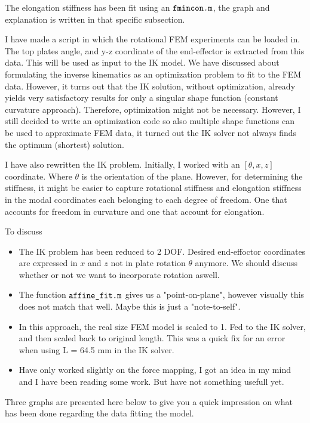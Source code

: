 The elongation stiffness has been fit using an $\verb+fmincon.m+$, the graph and explanation is written in that specific subsection.

I have made a script in which the rotational FEM experiments can be loaded in. The top plates angle, and y-z coordinate of the end-effector is extracted from this data. This will be used as input to the IK model. We have discussed about formulating the inverse kinematics as an optimization problem to fit to the FEM data. However, it turns out that the IK solution, without optimization, already yields very satisfactory results for only a singular shape function (constant curvature approach). Therefore, optimization might not be necessary. However, I still decided to write an optimization code so also multiple shape functions can be used to approximate FEM data, it turned out the IK solver not always finds the optimum (shortest) solution. 

I have also rewritten the IK problem. Initially, I worked with an $[\theta,x,z]$ coordinate. Where $\theta$ is the orientation of the plane. However, for determining the stiffness, it might be easier to capture rotational stiffness and elongation stiffness in the modal coordinates each belonging to each degree of freedom. One that accounts for freedom in curvature and one that account for elongation.

To discuss

\begin{itemize}
       \item The IK problem has been reduced to 2 DOF. Desired end-effoctor coordinates are expressed in $x$ and $z$ not in plate rotation $\theta$ anymore. We should discuss whether or not we want to incorporate rotation aswell.
    \item The function $\verb+affine_fit.m+$ gives us a "point-on-plane", however visually this does not match that well. Maybe this is just a "note-to-self".
    \item In this approach, the real size FEM model is scaled to 1. Fed to the IK solver, and then scaled back to original length. This was a quick fix for an error when using L = 64.5 mm in the IK solver. 
    \item Have only worked slightly on the force mapping, I got an idea in my mind and I have been reading some work. But have not something usefull yet.
\end{itemize}


Three graphs are presented here below to give you a quick impression on what has been done regarding the data fitting the model.

